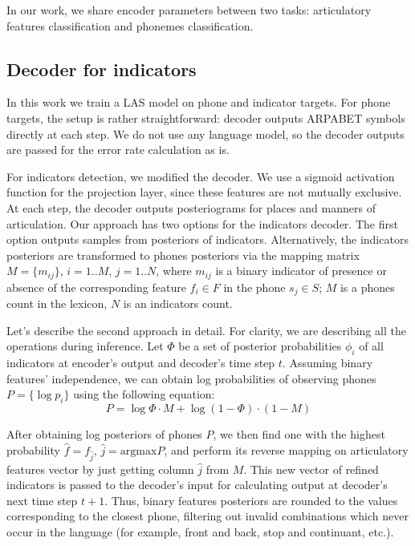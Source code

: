 \documentclass[a4paper]{article}
\begin{document}
In our work, we share encoder parameters between two tasks: articulatory features classification and phonemes classification.

\subsection{Decoder for indicators}
In this work we train a LAS model on phone and indicator targets. For phone targets, the setup is rather straightforward: decoder outputs ARPABET symbols directly at each step. We do not use any language model, so the decoder outputs are passed for the error rate calculation as is.

For indicators detection, we modified the decoder. We use a sigmoid activation function for the projection layer, since these features are not mutually exclusive. At each step, the decoder outputs posteriograms for places and manners of articulation. Our approach has two options for the indicators decoder. The first option outputs samples from posteriors of indicators. Alternatively, the indicators posteriors are transformed to phones posteriors via the mapping matrix $ M=\{m_{ij}\} $, $i=1..M$, $j=1..N$, where $ m_{ij} $ is a binary indicator of presence or absence of the corresponding feature $ f_i \in F $ in the phone $ s_j \in S $; $ M $ is a phones count in the lexicon, $ N $ is an indicators count.

Let's describe the second approach in detail. For clarity, we are describing all the operations during inference. Let $ \Phi $ be a set of posterior probabilities $ \phi_i $ of all indicators at encoder's output and decoder's time step $ t $. Assuming binary features' independence, we can obtain log probabilities of observing phones $ P=\{\log p_i\} $ using the following equation:
\begin{equation}
	P = \log{\Phi} \cdot M + \log{(1 - \Phi)} \cdot (1 - M)
\end{equation}

After obtaining log posteriors of phones $ P $, we then find one with the highest probability $\hat{f}=f_{\hat{j}}$, $\hat{j} = \textrm{argmax} P $, and perform its reverse mapping on articulatory features vector by just getting column $ \hat{j}$ from $ M $. This new vector of refined indicators is passed to the decoder's input for calculating output at decoder's next time step $ t + 1 $. Thus, binary features posteriors are rounded to the values corresponding to the closest phone, filtering out invalid combinations which never occur in the language (for example, front and back, stop and continuant, etc.).
\end{document}
